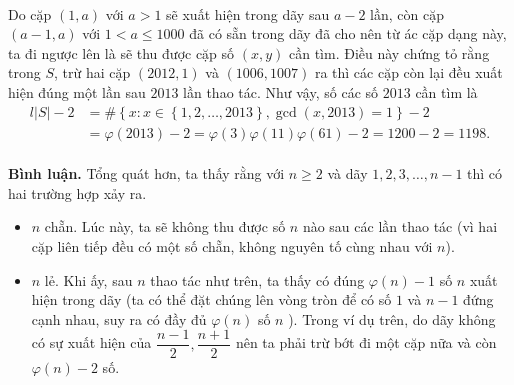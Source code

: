 \begin{vd}
{		\\
		Do cặp $(1, a)$ với $a > 1$ sẽ xuất hiện trong dãy sau $a - 2$ lần, còn cặp $(a - 1, a)$ với $1 < a \le 1000$ đã có sẵn trong dãy đã cho nên từ ác cặp dạng này, ta đi ngược lên là sẽ thu được cặp số $(x, y)$ cần tìm. Điều này chứng tỏ rằng trong $S$, trừ hai cặp $(2012, 1)$ và $(1006, 1007)$ ra thì các cặp còn lại đều xuất hiện đúng một lần sau $2013$ lần thao tác. Như vậy, số các số $2013$ cần tìm là 
		\[\begin{aligned}{l}
		\left| S \right| - 2 &  = \# \left\{ x:x \in \left\{ 1,2, \ldots,2013 \right\},\gcd \left( x,2013 \right) = 1 \right\} - 2\\
		&  = \varphi \left( 2013 \right) - 2 = \varphi \left( 3 \right)\varphi \left( 11 \right)\varphi \left( 61 \right) - 2 = 1200 - 2 = 1198.
		\end{aligned}\]
		\\
		{\bf Bình luận.}
		Tổng quát hơn, ta thấy rằng với $n \ge 2$ và dãy $1, 2, 3, \ldots, n -1$ thì có hai trường hợp xảy ra.
		
		\begin{itemize}
			\item $n$ chẵn. Lúc này, ta sẽ không thu được số $n$ nào sau các lần thao tác (vì hai cặp liên tiếp đều có một số chẵn, không nguyên tố cùng nhau với $n$).
			\item $n$ lẻ. Khi ấy, sau $n$ thao tác như trên, ta thấy có đúng $\varphi(n) - 1$ số $n$ xuất hiện trong dãy (ta có thể đặt chúng lên vòng tròn để có số $1$ và $n - 1$ đứng cạnh nhau, suy ra có đầy đủ $\varphi(n)$ số $n$ ). Trong ví dụ trên, do dãy không có sự xuất hiện của $\dfrac{n - 1}{2}, \dfrac{n + 1}{2}$ nên ta phải trừ bớt đi một cặp nữa và còn $\varphi(n) - 2$ số.	
		\end{itemize}
	}
\end{vd}
